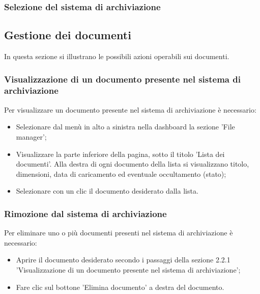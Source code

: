 \documentclass[10pt, a4paper]{article}
\begin{document}
\subsubsection{Selezione del sistema di archiviazione}

\subsection{Gestione dei documenti}
In questa sezione si illustrano le possibili azioni operabili sui documenti.
\subsubsection{Visualizzazione di un documento presente nel sistema di archiviazione}
Per visualizzare un documento presente nel sistema di archiviazione è necessario:
\begin{itemize}
    \item Selezionare dal menù in alto a sinistra nella dashboard la sezione 'File manager';
    \item Visualizzare la parte inferiore della pagina, sotto il titolo 'Lista dei documenti'. Alla destra di ogni documento della lista si visualizzano titolo, dimensioni, data di caricamento ed eventuale occultamento (stato);
    \item Selezionare con un clic il documento desiderato dalla lista.
\end{itemize}
\subsubsection{Rimozione dal sistema di archiviazione}
Per eliminare uno o più documenti presenti nel sistema di archiviazione è necessario:
\begin{itemize}
    \item Aprire il documento desiderato secondo i passaggi della sezione 2.2.1 'Visualizzazione di un documento presente nel sistema di archiviazione';
    \item Fare clic sul bottone 'Elimina documento' a destra del documento.
\end{itemize}
\end{document}
